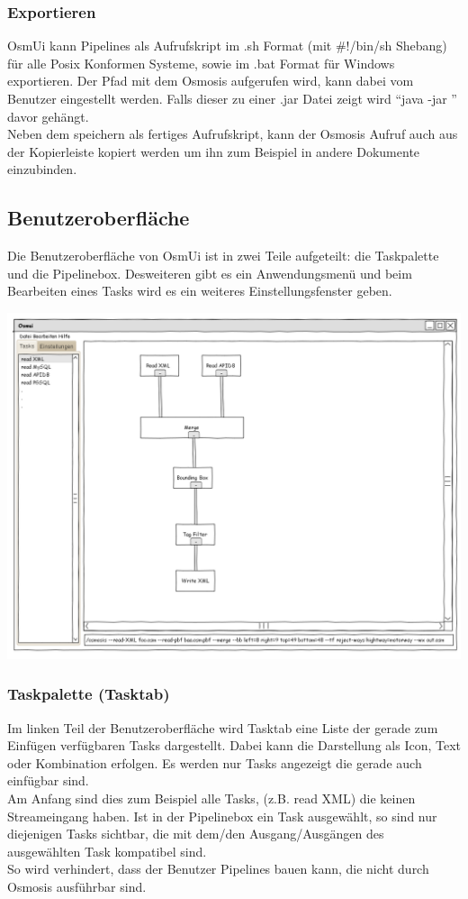 \documentclass[a4paper,12pt]{scrartcl}
\begin{document}
\subsubsection{Exportieren}
OsmUi kann Pipelines als Aufrufskript im .sh Format (mit \#!/bin/sh Shebang) für alle Posix Konformen Systeme, sowie im .bat Format für Windows exportieren.
Der Pfad mit dem Osmosis aufgerufen wird, kann dabei vom Benutzer eingestellt werden. Falls dieser zu einer .jar Datei zeigt wird ``java -jar '' davor
gehängt.\\ 
Neben dem speichern als fertiges Aufrufskript, kann der Osmosis Aufruf auch aus der Kopierleiste kopiert werden
um ihn zum Beispiel in andere Dokumente einzubinden. 

\subsection{Benutzeroberfläche}
Die Benutzeroberfläche von OsmUi ist in zwei Teile aufgeteilt: die Taskpalette und die Pipelinebox. Desweiteren gibt es ein Anwendungsmenü und beim Bearbeiten eines Tasks
wird es ein weiteres Einstellungsfenster geben.\\
\begin{center}
\includegraphics[width=15cm]{ui_prototype/OsmUi_Startseite.png}
\end{center}
\subsubsection{Taskpalette (Tasktab)}
Im linken Teil der Benutzeroberfläche wird Tasktab eine Liste der gerade zum Einfügen verfügbaren Tasks dargestellt. Dabei kann die Darstellung als Icon,
Text oder Kombination erfolgen. Es werden nur Tasks angezeigt die gerade auch einfügbar sind. \\
Am Anfang sind dies zum Beispiel alle Tasks, (z.B. read XML) die keinen Streameingang haben. Ist in der Pipelinebox ein Task ausgewählt, so
sind nur diejenigen Tasks sichtbar, die mit dem/den Ausgang/Ausgängen des ausgewählten Task kompatibel sind.\\
So wird verhindert, dass der Benutzer Pipelines bauen kann, die nicht durch Osmosis ausführbar sind.
\end{document}
